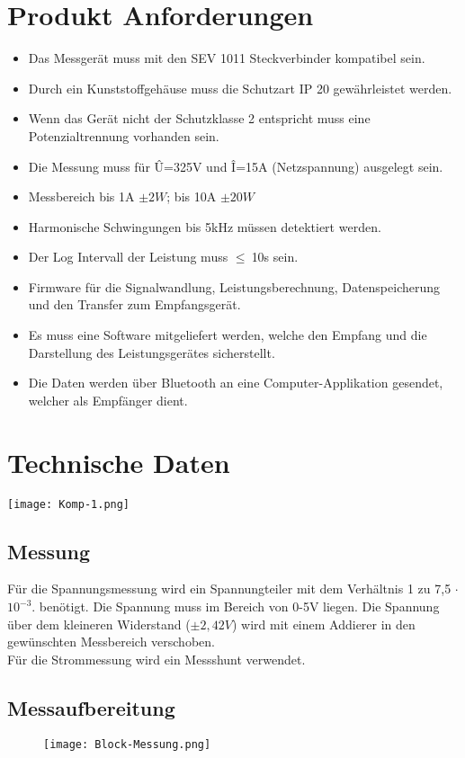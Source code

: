 \documentclass[12pt,a4paper]{article}
\begin{document}
\section{Produkt Anforderungen}
\begin{itemize}
\item Das Messgerät muss mit den SEV 1011 Steckverbinder kompatibel sein.
\item Durch ein Kunststoffgehäuse muss die Schutzart IP 20 gewährleistet werden.
\item Wenn das Gerät nicht der Schutzklasse 2 entspricht muss eine Potenzialtrennung vorhanden sein.
\item Die Messung muss für Û=325V und Î=15A (Netzspannung) ausgelegt sein.
\item Messbereich bis 1A $\pm2W$; bis 10A $\pm 20W$
\item Harmonische Schwingungen bis 5kHz müssen detektiert werden.
\item Der Log Intervall der Leistung muss $\leq \ $10s sein.

\item Firmware für die Signalwandlung, Leistungsberechnung, Datenspeicherung und den Transfer zum Empfangsgerät.
\item Es muss eine Software mitgeliefert werden, welche den Empfang und die Darstellung des Leistungsgerätes sicherstellt. 

\item Die Daten werden über Bluetooth an eine Computer-Applikation gesendet, welcher als Empfänger dient. 
\end{itemize}


\section{Technische Daten}

 \texttt{[image: Komp-1.png]}

\subsection{Messung}
Für die Spannungsmessung wird ein Spannungteiler mit dem Verhältnis 1 zu 7,5 $\cdot$ $10^{-3}$. benötigt. Die Spannung muss im Bereich von 0-5V liegen. Die Spannung über dem kleineren Widerstand ($\pm 2,42V$) wird mit einem Addierer in den gewünschten Messbereich verschoben.\\
Für die Strommessung wird ein Messshunt verwendet.
\subsection{Messaufbereitung}
\begin{figure}[htbp] 
  \centering
\texttt{[image: Block-Messung.png]}
  \caption{}
  \label{fig:Bild1}
\end{figure}
\end{document}
